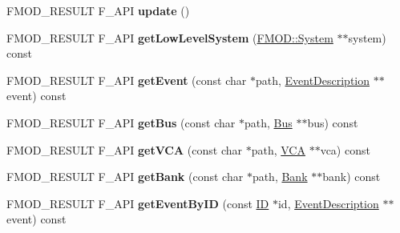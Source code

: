 \begin{DoxyCompactItemize}
\item 
\hypertarget{class_f_m_o_d_1_1_studio_1_1_system_a70af235a4d84807ed3840c5b8f1b1143}{F\+M\+O\+D\+\_\+\+R\+E\+S\+U\+L\+T F\+\_\+\+A\+P\+I {\bfseries update} ()}\label{class_f_m_o_d_1_1_studio_1_1_system_a70af235a4d84807ed3840c5b8f1b1143}

\item 
\hypertarget{class_f_m_o_d_1_1_studio_1_1_system_ac9fa1740615fb7a8312ce9f8c3d32e7c}{F\+M\+O\+D\+\_\+\+R\+E\+S\+U\+L\+T F\+\_\+\+A\+P\+I {\bfseries get\+Low\+Level\+System} (\hyperlink{class_f_m_o_d_1_1_system}{F\+M\+O\+D\+::\+System} $\ast$$\ast$system) const }\label{class_f_m_o_d_1_1_studio_1_1_system_ac9fa1740615fb7a8312ce9f8c3d32e7c}

\item 
\hypertarget{class_f_m_o_d_1_1_studio_1_1_system_a5f71424a03ec2ab225445f4a9dc5e846}{F\+M\+O\+D\+\_\+\+R\+E\+S\+U\+L\+T F\+\_\+\+A\+P\+I {\bfseries get\+Event} (const char $\ast$path, \hyperlink{class_f_m_o_d_1_1_studio_1_1_event_description}{Event\+Description} $\ast$$\ast$event) const }\label{class_f_m_o_d_1_1_studio_1_1_system_a5f71424a03ec2ab225445f4a9dc5e846}

\item 
\hypertarget{class_f_m_o_d_1_1_studio_1_1_system_ad2ec2f9a5de4ec27917059db31c926df}{F\+M\+O\+D\+\_\+\+R\+E\+S\+U\+L\+T F\+\_\+\+A\+P\+I {\bfseries get\+Bus} (const char $\ast$path, \hyperlink{class_f_m_o_d_1_1_studio_1_1_bus}{Bus} $\ast$$\ast$bus) const }\label{class_f_m_o_d_1_1_studio_1_1_system_ad2ec2f9a5de4ec27917059db31c926df}

\item 
\hypertarget{class_f_m_o_d_1_1_studio_1_1_system_a39556e8dc7277fd28a55b839044e4827}{F\+M\+O\+D\+\_\+\+R\+E\+S\+U\+L\+T F\+\_\+\+A\+P\+I {\bfseries get\+V\+C\+A} (const char $\ast$path, \hyperlink{class_f_m_o_d_1_1_studio_1_1_v_c_a}{V\+C\+A} $\ast$$\ast$vca) const }\label{class_f_m_o_d_1_1_studio_1_1_system_a39556e8dc7277fd28a55b839044e4827}

\item 
\hypertarget{class_f_m_o_d_1_1_studio_1_1_system_a84ce7417d7d3626d5bc913a1dd064900}{F\+M\+O\+D\+\_\+\+R\+E\+S\+U\+L\+T F\+\_\+\+A\+P\+I {\bfseries get\+Bank} (const char $\ast$path, \hyperlink{class_f_m_o_d_1_1_studio_1_1_bank}{Bank} $\ast$$\ast$bank) const }\label{class_f_m_o_d_1_1_studio_1_1_system_a84ce7417d7d3626d5bc913a1dd064900}

\item 
\hypertarget{class_f_m_o_d_1_1_studio_1_1_system_a2b98fb95e33fc6dcf3339bcff8ce3c63}{F\+M\+O\+D\+\_\+\+R\+E\+S\+U\+L\+T F\+\_\+\+A\+P\+I {\bfseries get\+Event\+By\+I\+D} (const \hyperlink{struct_f_m_o_d___g_u_i_d}{I\+D} $\ast$id, \hyperlink{class_f_m_o_d_1_1_studio_1_1_event_description}{Event\+Description} $\ast$$\ast$event) const }\label{class_f_m_o_d_1_1_studio_1_1_system_a2b98fb95e33fc6dcf3339bcff8ce3c63}


\end{DoxyCompactItemize}
